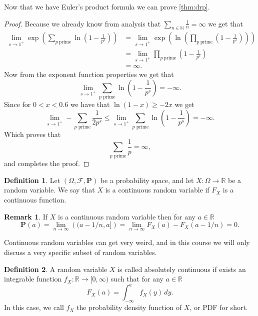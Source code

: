 \documentclass[11pt,a4paper]{article}
\theoremstyle{definition}
\newtheorem{definition}{Definition}[section]
\newtheorem{remark}{Remark}[section]
\theoremstyle{plain}
\newcommand{\N}{\mathbb{N}}
\newcommand{\R}{\mathbb{R}}
\begin{document}
  Now that we have Euler's product formula we can prove \autoref{thm:drp}.
  \begin{proof}
    Because we already know from analysis that 
    $\sum_{n \in \N} \frac 1n = \infty$ we get that
    \begin{align*}
      \lim_{s \to 1^+}
      \exp\left(\sum_{p \ \mathrm{prime}}
      \ln \left(1 - \frac{1}{p^{s}}\right)\right) &=
      \lim_{s \to 1^+}
      \exp \left(\ln\left(\prod_{p \ \mathrm{prime}}
      \left(1 - \frac{1}{p^{s}}\right)\right)\right) \\ &= 
      \lim_{s \to 1^+} 
      \prod_{p \ \mathrm{prime}} \left(1 - \frac{1}{p^{s}}\right) \\ &= 
      \infty.
    \end{align*}
    Now from the exponent function properties we get that
    \[
      \lim_{s \to 1^+} 
      \sum_{p \text{ prime}} \ln\left(1 - \frac{1}{p^{s}}\right) =
      - \infty.
    \]
    Since for $0 < x < 0.6$ we have that $\ln(1-x) \geq -2x$ we get
    \[
      \lim_{s \to 1^+}
      - \sum_{p \text{ prime}} \frac{1}{2 p^s} \le
      \lim_{s \to 1^+}
      \sum_{p \text{ prime}} \ln\left(1 - \frac{1}{p^{s}}\right) =
      - \infty.
    \]
    Which proves that
    \[
      \sum_{p \text{ prime}} \frac{1}{p} = \infty,
    \]
    and completes the proof.
  \end{proof}

  \begin{definition}
    Let $(\Omega, \mathcal F, \mathbf P)$ be a probability space,
    and let $X \colon \Omega \to \R$ be a random variable.
    We say that $X$ is a continuous random variable if $F_X$ is a
    continuous function.
  \end{definition}
  \begin{remark}
    If $X$ is a continuous random variable then for any $a \in \R$
    \[
      \mathbf P(a) = 
      \lim_{n \to \infty}\left((a - 1/n, a]\right) =
      \lim_{n \to \infty} F_X(a) - F_X(a - 1/n) =
      0.
    \]
  \end{remark}
  
  Continuous random variables can get very weird, and in this course we
  will only discuss a very specific subset of random variables.

  \begin{definition}
    A random variable $X$ is called absolutely continuous if exists an
    integrable function $f_X \colon \R \to [0,\infty)$ such that for any
    $a \in \R$
    \[
      F_X(a) = \int_{-\infty}^{a} f_X(y)\,dy.
    \]
    In this case, we call $f_X$ the probability density function of $X$,
    or PDF for short.
  \end{definition}
  
\end{document}
